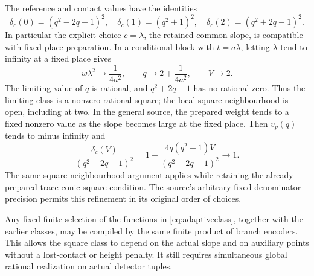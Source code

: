 The reference and contact values have the identities
\[
 \delta_c(0)=(q^2-2q-1)^2,\quad
 \delta_c(1)=(q^2+1)^2,\quad
 \delta_c(2)=(q^2+2q-1)^2.
\]
In particular the explicit choice $c=\lambda$, the retained common
slope, is compatible with fixed-place preparation. In a conditional
block with $t=a\lambda$, letting $\lambda$ tend to infinity at a
fixed place gives
\[
 w\lambda^2\longrightarrow\frac1{4a^2},\qquad
 q\longrightarrow2+\frac1{4a^2},\qquad V\longrightarrow2.
\]
The limiting value of $q$ is rational, and $q^2+2q-1$ has no rational
zero. Thus the limiting class is a nonzero rational square; the local
square neighbourhood is open, including at two. In the general source,
the prepared weight tends to a fixed nonzero value as the slope
becomes large at the fixed place. Then $v_p(q)$ tends to minus infinity
and
\[
 \frac{\delta_c(V)}{(q^2-2q-1)^2}
 =1+\frac{4q(q^2-1)V}{(q^2-2q-1)^2}\longrightarrow1.
\]
The same square-neighbourhood argument applies while retaining the
already prepared trace-conic square condition. The source's arbitrary
fixed denominator precision permits this refinement in its original
order of choices.

Any fixed finite selection of the functions in
\eqref{eq:adaptiveclass}, together with the earlier classes, may be
compiled by the same finite product of branch encoders. This allows
the square class to depend on the actual slope and on auxiliary
points without a lost-contact or height penalty. It still requires
simultaneous global rational realization on actual detector tuples.
